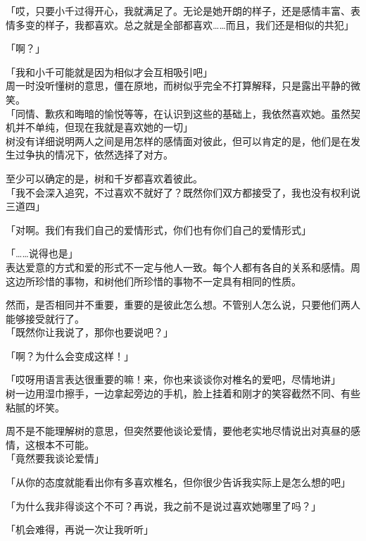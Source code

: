 「哎，只要小千过得开心，我就满足了。无论是她开朗的样子，还是感情丰富、表情多变的样子，我都喜欢。总之就是全部都喜欢……而且，我们还是相似的共犯」

「啊？」

「我和小千可能就是因为相似才会互相吸引吧」\\

周一时没听懂树的意思，僵在原地，而树似乎完全不打算解释，只是露出平静的微笑。\\

「同情、歉疚和晦暗的愉悦等等，在认识到这些的基础上，我依然喜欢她。虽然契机并不单纯，但现在我就是喜欢她的一切」\\

树没有详细说明两人之间是用怎样的感情面对彼此，但可以肯定的是，他们是在发生过争执的情况下，依然选择了对方。

至少可以确定的是，树和千岁都喜欢着彼此。\\

「我不会深入追究，不过喜欢不就好了？既然你们双方都接受了，我也没有权利说三道四」

「对啊。我们有我们自己的爱情形式，你们也有你们自己的爱情形式」

「……说得也是」\\

表达爱意的方式和爱的形式不一定与他人一致。每个人都有各自的关系和感情。周这边所珍惜的事物，和树他们所珍惜的事物不一定具有相同的性质。

然而，是否相同并不重要，重要的是彼此怎么想。不管别人怎么说，只要他们两人能够接受就行了。\\

「既然你让我说了，那你也要说吧？」

「啊？为什么会变成这样！」

「哎呀用语言表达很重要的嘛！来，你也来谈谈你对椎名的爱吧，尽情地讲」\\

树一边用湿巾擦手，一边拿起旁边的手机，脸上挂着和刚才的笑容截然不同、有些粘腻的坏笑。

周不是不能理解树的意思，但突然要他谈论爱情，要他老实地尽情说出对真昼的感情，这根本不可能。\\

「竟然要我谈论爱情」

「从你的态度就能看出你有多喜欢椎名，但你很少告诉我实际上是怎么想的吧」

「为什么我非得谈这个不可？再说，我之前不是说过喜欢她哪里了吗？」

「机会难得，再说一次让我听听」

